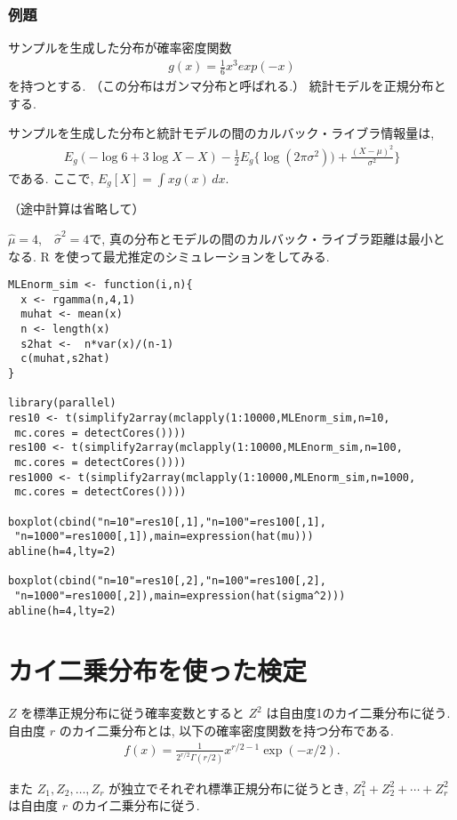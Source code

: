 \documentclass{jarticle}
\begin{document}
\subsubsection{例題}
サンプルを生成した分布が確率密度関数
\begin{align}
g(x) = \frac{1}{6}x^3 exp(-x)
\end{align}
を持つとする. （この分布はガンマ分布と呼ばれる.）
統計モデルを正規分布とする. 

サンプルを生成した分布と統計モデルの間のカルバック・ライブラ情報量は, 
 \begin{align}
 E_g (-\log6+3\log X-X)-\frac{1}{2}E_g\{\log(2\pi \sigma^2)) + \frac{(X-\mu)^2}{\sigma^2}\}
 \end{align}
 である. ここで, $E_g[X] = \int xg(x)\, dx$.
 
（途中計算は省略して）

$\hat \mu=4$,　$\hat \sigma^2=4$で, 真の分布とモデルの間のカルバック・ライブラ距離は最小となる. 
R を使って最尤推定のシミュレーションをしてみる.
\begin{verbatim}
MLEnorm_sim <- function(i,n){
  x <- rgamma(n,4,1)
  muhat <- mean(x)
  n <- length(x)
  s2hat <-  n*var(x)/(n-1)
  c(muhat,s2hat)
}

library(parallel)
res10 <- t(simplify2array(mclapply(1:10000,MLEnorm_sim,n=10,
 mc.cores = detectCores())))
res100 <- t(simplify2array(mclapply(1:10000,MLEnorm_sim,n=100,
 mc.cores = detectCores())))
res1000 <- t(simplify2array(mclapply(1:10000,MLEnorm_sim,n=1000,
 mc.cores = detectCores())))

boxplot(cbind("n=10"=res10[,1],"n=100"=res100[,1],
 "n=1000"=res1000[,1]),main=expression(hat(mu)))
abline(h=4,lty=2)

boxplot(cbind("n=10"=res10[,2],"n=100"=res100[,2],
 "n=1000"=res1000[,2]),main=expression(hat(sigma^2)))
abline(h=4,lty=2)
\end{verbatim}

\section{カイ二乗分布を使った検定}

$Z$ を標準正規分布に従う確率変数とすると $Z^2$ は自由度1のカイ二乗分布に従う. 
自由度 $r$ のカイ二乗分布とは, 以下の確率密度関数を持つ分布である. 
\begin{align}
f(x) = \frac{1}{2^{r/2}\Gamma(r/2)}x^{r/2-1}\exp(-x/2).
\end{align}

また $Z_1, Z_2, \ldots, Z_r$ が独立でそれぞれ標準正規分布に従うとき, $Z_1^2+ Z_2^2+ \cdots +Z_r^2$ は自由度 $r$ のカイ二乗分布に従う. 
\end{document}

